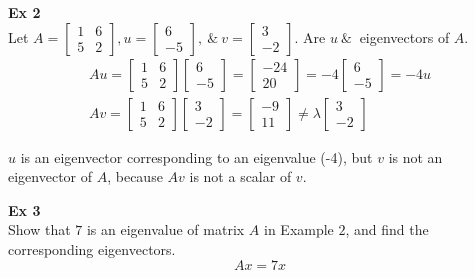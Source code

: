 \documentclass{article}
\begin{document}
  \textbf{Ex 2}\\
  Let $ A=\begin{bmatrix}
      1 &6\\
      5 &2
    \end{bmatrix}, u=\begin{bmatrix}
      6\\
      -5
  \end{bmatrix}, ~\&~ v=\begin{bmatrix}
      3\\
      -2
  \end{bmatrix} $. Are $ u ~\&~ $ eigenvectors of $ A $.
  \[
      \begin{gathered}
      Au=\begin{bmatrix}
          1 &6\\
          5 &2
      \end{bmatrix}
      \begin{bmatrix}
          6\\
          -5
      \end{bmatrix}=\begin{bmatrix}
          -24\\
          20
      \end{bmatrix}=-4\begin{bmatrix}
          6\\
          -5
      \end{bmatrix}=-4u\\
      Av=\begin{bmatrix}
          1 &6\\
          5 &2
      \end{bmatrix}
      \begin{bmatrix}
          3\\
          -2
      \end{bmatrix}=
      \begin{bmatrix}
          -9\\
          11
      \end{bmatrix}\neq
      \lambda \begin{bmatrix}
          3\\
          -2
      \end{bmatrix}
      \end{gathered}
  \]

  $ u $ is an eigenvector corresponding to an eigenvalue (-4), but $ v $ is not an eigenvector of $ A $, because $ Av $ is not a scalar of $ v $.

  \textbf{Ex 3}\\
  Show that $ 7 $ is an eigenvalue of matrix $ A $ in Example $ 2 $, and find the corresponding eigenvectors.
  \[
      Ax=7x
  \]
  
\end{document}

